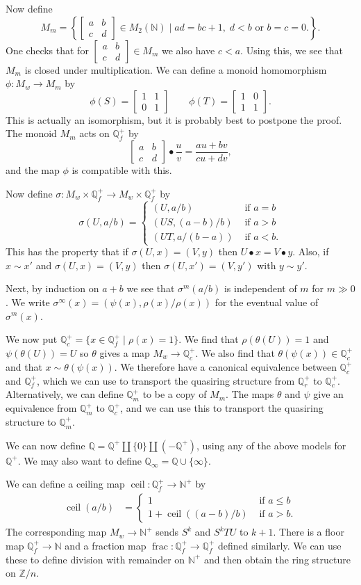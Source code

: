 \documentclass{amsart}
\newcommand{\ceil}	{\operatorname{ceil}}
\newcommand{\frc}	{\operatorname{frac}}
\newcommand{\N}         {{\mathbb{N}}}
\newcommand{\Q}         {{\mathbb{Q}}}
\newcommand{\Z}         {{\mathbb{Z}}}
\newcommand{\tht}       {\theta}
\newcommand{\sg}        {\sigma}
\newcommand{\bbm}       {\left[\begin{matrix}}
\newcommand{\ebm}       {\end{matrix}\right]}
\newcommand{\bsm}       {\left[\begin{smallmatrix}}
\newcommand{\esm}       {\end{smallmatrix}\right]}
\newcommand{\bu}	{\bullet}
\newcommand{\st}        {\;|\;}
\newcommand{\tm}        {\times}
\renewcommand{\:}{\colon}
\theoremstyle{definition}
\begin{document}
Now define 
\[ M_m = \left\{\bbm a & b \\ c & d \ebm \in M_2(\N) \st 
                 ad = bc+1,\; d<b \text{ or } b=c=0. \right\}.
\]
One checks that for $\bsm a&b\\c&d\esm\in M_m$ we also have $c<a$.
Using this, we see that $M_m$ is closed under multiplication.  We can
define a monoid homomorphism $\phi\:M_w\to M_m$ by 
\[ \phi(S) = \bbm 1&1 \\ 0&1 \ebm \qquad 
   \phi(T) = \bbm 1&0 \\ 1&1 \ebm.
\]
This is actually an isomorphism, but it is probably best to postpone
the proof.  The monoid $M_m$ acts on $\Q^+_f$ by 
\[ \bbm a & b \\ c & d \ebm \bu \frac{u}{v}  =
    \frac{au+bv}{cu+dv},
\]
and the map $\phi$ is compatible with this.

Now define $\sg\:M_w\tm\Q^+_f\to M_w\tm\Q^+_f$ by 
\[ \sg(U,a/b) = \begin{cases}
    (U,a/b) & \text{ if } a = b \\
    (US,(a-b)/b) & \text{ if } a > b \\
    (UT,a/(b-a)) & \text{ if } a < b.
   \end{cases}
\]
This has the property that if $\sg(U,x)=(V,y)$ then $U\bu x=V\bu y$.
Also, if $x\sim x'$ and $\sg(U,x)=(V,y)$ then $\sg(U,x')=(V,y')$ with
$y\sim y'$.

Next, by induction on $a+b$ we see that $\sg^m(a/b)$ is independent of
$m$ for $m\gg 0$.  We write
$\sg^{\infty}(x)=(\psi(x),\rho(x)/\rho(x))$ for the eventual value of
$\sg^m(x)$.

We now put $\Q^+_c=\{x\in\Q^+_f\st\rho(x)=1\}$.  We find that
$\rho(\tht(U))=1$ and $\psi(\tht(U))=U$ so $\tht$ gives a map
$M_w\to\Q^+_c$.  We also find that $\tht(\psi(x))\in\Q^+_c$ and that
$x\sim\tht(\psi(x))$.  We therefore have a canonical equivalence
between $\Q^+_c$ and $\Q^+_f$, which we can use to transport the
quasiring structure from $\Q^+_r$ to $\Q^+_c$.  Alternatively, we can
define $\Q^+_m$ to be a copy of $M_m$.  The maps $\tht$ and $\psi$
give an equivalence from $\Q^+_m$ to $\Q^+_c$, and we can use this to
transport the quasiring structure to $\Q^+_m$.  

We can now define $\Q=\Q^+\amalg\{0\}\amalg(-\Q^+)$, using any of the
above models for $\Q^+$.  We may also want to define
$\Q_\infty=\Q\cup\{\infty\}$. 

We can define a ceiling map $\ceil\:\Q_f^+\to\N^+$ by 
\begin{align*}
 \ceil(a/b) &= \begin{cases}
  1 & \text{ if } a \leq b \\
  1 + \ceil((a-b)/b) & \text{ if } a > b.
 \end{cases}
\end{align*}
The corresponding map $M_w\to\N^+$ sends $S^k$ and $S^kTU$ to $k+1$.
There is a floor map $\Q^+_f\to\N$ and a fraction map
$\frc\:\Q^+_f\to\Q^+_f$ defined similarly.  We can use these to define
division with remainder on $\N^+$ and then obtain the ring structure
on $\Z/n$.
\end{document}

